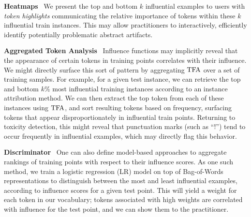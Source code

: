 \documentclass[11pt]{article}
\newcommand\para[1]{\vskip 1mm\noindent\textbf{#1}~}
\begin{document}
\para{Heatmaps} We present the top and bottom $k$ influential examples to users with \emph{token highlights} communicating the relative importance of tokens within these $k$ influential train instances. 
This may allow practitioners to interactively, efficiently identify potentially problematic abstract artifacts.

\para{Aggregated Token Analysis} 
Influence functions may implicitly reveal %
that the appearance of certain tokens in training points correlates with their influence.
We might directly surface this sort of pattern by aggregating $\text{TFA}$ over a set of training samples. 
For example, for a given test instance, we can retrieve the top and bottom $k\%$ %
most influential training instances according to an instance attribution method. %
We can then extract the top token from each of these instances using $\text{TFA}$, and sort resulting tokens based on frequency, surfacing tokens that appear disproportionately in influential train points.
Returning to %
toxicity detection, this might reveal that punctuation marks (such as ``!'') tend to occur frequently in influential examples, which may directly flag this behavior.%

\para{Discriminator} One can also define model-based approaches to aggregate rankings of training points with respect to their influence scores.
As one such method, we %
train a logistic regression (LR) model on top of Bag-of-Words representations to distinguish between the most and least influential examples, according to influence scores for a given test point. %
This will yield a weight for each token in our vocabulary; tokens associated with high weights are correlated with influence for the test point, and we can show them to the practitioner.
\end{document}
